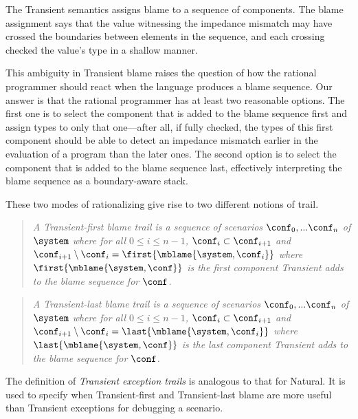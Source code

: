 
The Transient semantics assigns blame to a sequence of components. The blame
assignment says that the value witnessing the impedance mismatch may have
crossed the boundaries between elements in the sequence, and each crossing
checked the value's type in a shallow manner.

This ambiguity in Transient blame raises the question of how the rational
programmer should react when the language produces a blame sequence. Our answer
is that the rational programmer has at least two reasonable options. The first
one is to select the component that is added to the blame sequence first and
assign types to only that one---after all, if fully checked, the types of this
first component should be able to detect an impedance mismatch earlier in the
evaluation of a program than the later ones. The second option is to select the
component that is added to the blame sequence last, effectively interpreting the
blame sequence as a boundary-aware stack.

These two modes of rationalizing give rise to two different notions of trail.

\begin{quote}
\it A \emph{Transient-first blame trail} is a sequence of scenarios
$\conf_0,...\conf_n$ of $\system$ where for all $0 \leq i \leq n - 1$,
$\conf_i \subset \conf_{i+1}$ and $\conf_{i+1} \setminus \conf_i =
\first{\mblame{\system, \conf_i}}$ where $\first{\mblame{\system, \conf}}$ is the
first component Transient adds to the blame sequence for $\conf$.
\end{quote}

\begin{quote}
\it A \emph{Transient-last blame trail} is a sequence of scenarios
$\conf_0,...\conf_n$ of $\system$ where for all $0 \leq i \leq n - 1$,
$\conf_i \subset \conf_{i+1}$ and $\conf_{i+1} \setminus \conf_i =
  \last{\mblame{\system, \conf_i}}$ where $\last{\mblame{\system, \conf}}$ is the
last component Transient adds to the blame sequence for $\conf$.
\end{quote}

The definition of \emph{Transient exception trails} is analogous to that for
Natural. It is used to specify when Transient-first and Transient-last blame are
more useful than Transient exceptions for debugging a scenario.


